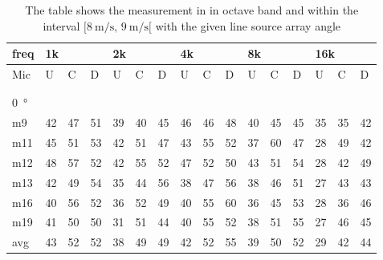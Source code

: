 \begin{table}[H]
\centering
\caption{The table shows the measurement in in octave band and within the interval $[\SI{8}{\meter\per\second},\, \SI{9}{\meter\per\second}[ $ with the given line source array angle}
\begin{tabular}{l|l|l|l|l|l|l|l|l|l|l|l|l|lll}
freq & \multicolumn{3}{l|}{1k} & \multicolumn{3}{l|}{2k} & \multicolumn{3}{l|}{4k} & \multicolumn{3}{l|}{8k} & \multicolumn{3}{l}{16k}                                \\ \hline
Mic  & U      & C      & D     & U      & C      & D     & U      & C      & D     & U      & C      & D     & \multicolumn{1}{l|}{U}  & \multicolumn{1}{l|}{C}  & D  \\ \hline
 & \multicolumn{3}{l|}{} & \multicolumn{3}{l|}{} & \multicolumn{3}{l|}{} & \multicolumn{3}{l|}{} & \multicolumn{3}{l}{}                                \\ 
 \multicolumn{16}{l}{ } \\   
\SI{0}{\degree}   & \multicolumn{3}{l|}{} & \multicolumn{3}{l|}{} & \multicolumn{3}{l|}{} & \multicolumn{3}{l|}{} & \multicolumn{3}{l}{}   \\  \hline
m9   & 42     & 47     & 51    & 39     & 40     & 45    & 46     & 46     & 48    & 40     & 45     & 45    & \multicolumn{1}{l|}{35} & \multicolumn{1}{l|}{35} & 42 \\
m11  & 45     & 51     & 53    & 42     & 51     & 47    & 43     & 55     & 52    & 37     & 60     & 47    & \multicolumn{1}{l|}{28} & \multicolumn{1}{l|}{49} & 42 \\
m12  & 48     & 57     & 52    & 42     & 55     & 52    & 47     & 52     & 50    & 43     & 51     & 54    & \multicolumn{1}{l|}{28} & \multicolumn{1}{l|}{42} & 49 \\
m13  & 42     & 49     & 54    & 35     & 44     & 56    & 38     & 47     & 56    & 38     & 46     & 51    & \multicolumn{1}{l|}{27} & \multicolumn{1}{l|}{43} & 43 \\
m16  & 40     & 56     & 52    & 36     & 52     & 49    & 40     & 55     & 60    & 36     & 45     & 53    & \multicolumn{1}{l|}{28} & \multicolumn{1}{l|}{36} & 46 \\
m19  & 41     & 50     & 50    & 31     & 51     & 44    & 40     & 55     & 52    & 38     & 51     & 55    & \multicolumn{1}{l|}{27} & \multicolumn{1}{l|}{46} & 45 \\ \hline
avg  &  43    &  52    & 52    &  38     &  49    &  49   & 42     & 52     & 55    & 39     & 50     & 52    & \multicolumn{1}{l|}{29}   & \multicolumn{1}{l|}{42}   & 44 \\ \hline  

\end{tabular}
\end{table}
